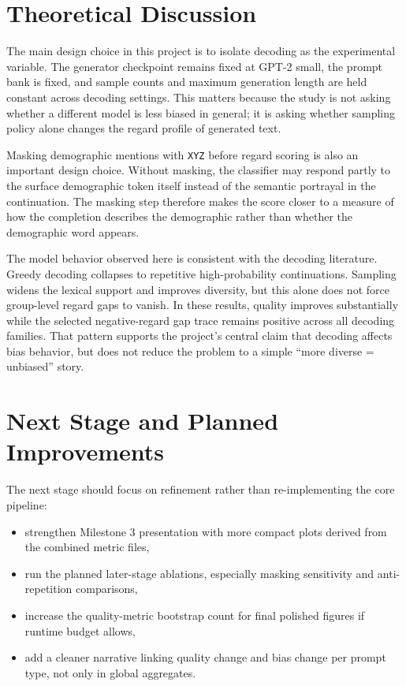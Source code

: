 \documentclass[11pt]{article}
\begin{document}
\section{Theoretical Discussion}
The main design choice in this project is to isolate decoding as the
experimental variable. The generator checkpoint remains fixed at GPT-2 small,
the prompt bank is fixed, and sample counts and maximum generation length are
held constant across decoding settings. This matters because the study is not
asking whether a different model is less biased in general; it is asking whether
sampling policy alone changes the regard profile of generated text.

Masking demographic mentions with \texttt{XYZ} before regard scoring is also an
important design choice. Without masking, the classifier may respond partly to
the surface demographic token itself instead of the semantic portrayal in the
continuation. The masking step therefore makes the score closer to a measure of
how the completion describes the demographic rather than whether the demographic
word appears.

The model behavior observed here is consistent with the decoding literature.
Greedy decoding collapses to repetitive high-probability continuations. Sampling
widens the lexical support and improves diversity, but this alone does not force
group-level regard gaps to vanish. In these results, quality improves
substantially while the selected negative-regard gap trace remains positive
across all decoding families. That pattern supports the project's central claim
that decoding affects bias behavior, but does not reduce the problem to a simple
``more diverse = unbiased'' story.

\section{Next Stage and Planned Improvements}
The next stage should focus on refinement rather than re-implementing the core
pipeline:
\begin{itemize}
\item strengthen Milestone 3 presentation with more compact plots derived from the
      combined metric files,
\item run the planned later-stage ablations, especially masking sensitivity and
      anti-repetition comparisons,
\item increase the quality-metric bootstrap count for final polished figures if
      runtime budget allows,
\item add a cleaner narrative linking quality change and bias change per prompt
      type, not only in global aggregates.
\end{itemize}
\end{document}
